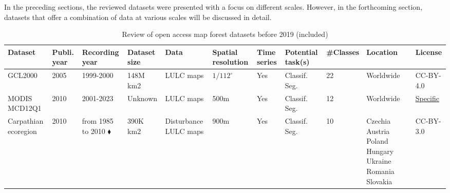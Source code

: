 \documentclass{CUP-JNL-DTM}%
\theoremstyle{definition}
\numberwithin{equation}{section}
\begin{document}
In the preceding sections, the reviewed datasets were presented with a focus on different scales. However, in the forthcoming section, datasets that offer a combination of data at various scales will be discussed in detail.


\begin{table*}[ht]
\fontsize{6.5pt}{7.5pt}\selectfont %
\renewcommand{\arraystretch}{1.5} %
\setlength\tabcolsep{5pt} %
\caption{Review of open access map forest datasets before 2019 (included)}
{\begin{fntable}
\centering
\begin{tabular}{p{1.5cm} | p{0.4cm} | p{1cm} | p{1.3cm} | p{1.2cm} : p{1cm} | p{0.4cm} | p{0.7cm} | p{0.8cm} | p{1cm} | p{1.1cm}}
\toprule
Dataset  & Publi. year & Recording year & Dataset size & Data  & Spatial resolution & Time series & Potential task(s) & \#Classes & Location  & License  \\
\midrule

GCL2000	\cite{bartholome_glc2000_2005} & 2005 & 1999-2000 & 148M km2 & LULC maps & $1/112^{\circ}$ & Yes & Classif. \newline Seg. & 22 & Worldwide & CC-BY-4.0 \\

MODIS MCD12Q1 \cite{friedl_modis_2010} & 2010 & 2001-2023 & Unknown & LULC maps	& 500m & Yes & Classif. \newline Seg. & 12 & Worldwide & \href{https://lpdaac.usgs.gov/data/data-citation-and-policies/}{Specific} \\

Carpathian ecoregion \cite{griffiths_forest_2014} & 2010 & from 1985 to 2010 $\blacklozenge$ & 390K km2	& Disturbance \newline LULC maps & 900m & Yes & Classif. \newline Seg. & 10 & Czechia \newline Austria \newline Poland \newline Hungary \newline Ukraine \newline Romania \newline Slovakia & CC-BY-3.0 \\


\end{tabular}
\end{fntable}}
\end{table*}
\end{document}

